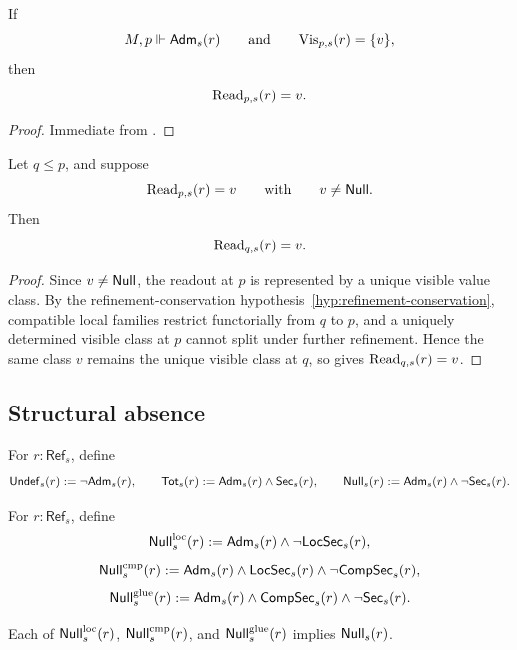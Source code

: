 \begin{corollary}\label{cor:nonnull-readout-criterion}
If
\[
M,p\Vdash \mathsf{Adm}_s(r)
\qquad\text{and}\qquad
\mathrm{Vis}_{p,s}(r)=\{v\},
\]
then
\[
\mathrm{Read}_{p,s}(r)=v.
\]
\end{corollary}

\begin{proof}
Immediate from .
\end{proof}

\begin{proposition}\label{prop:typed-readout-persistence}
Let $q\le p$, and suppose
\[
\mathrm{Read}_{p,s}(r)=v
\qquad\text{with}\qquad
v\neq \mathsf{Null}.
\]
Then
\[
\mathrm{Read}_{q,s}(r)=v.
\]
\end{proposition}

\begin{proof}
Since $v\neq\mathsf{Null}$, the readout at $p$ is represented by a unique visible value class. By the refinement-conservation hypothesis~\ref{hyp:refinement-conservation}, compatible local families restrict functorially from $q$ to $p$, and a uniquely determined visible class at $p$ cannot split under further refinement. Hence the same class $v$ remains the unique visible class at $q$, so  gives $\mathrm{Read}_{q,s}(r)=v$.
\end{proof}

\subsection{Structural absence}

\begin{definition}\label{def:undef-total-null}
For $r:\mathsf{Ref}_s$, define
\[
\mathsf{Undef}_s(r):=\neg\mathsf{Adm}_s(r),\qquad
\mathsf{Tot}_s(r):=\mathsf{Adm}_s(r)\land \mathsf{Sec}_s(r),\qquad
\mathsf{Null}_s(r):=\mathsf{Adm}_s(r)\land \neg\mathsf{Sec}_s(r).
\]
\end{definition}

\begin{definition}\label{def:null-failure-modes}
For $r:\mathsf{Ref}_s$, define
\[
\mathsf{Null}^{\mathrm{loc}}_s(r):=\mathsf{Adm}_s(r)\land \neg\mathsf{LocSec}_s(r),
\]
\[
\mathsf{Null}^{\mathrm{cmp}}_s(r):=\mathsf{Adm}_s(r)\land \mathsf{LocSec}_s(r)\land \neg\mathsf{CompSec}_s(r),
\]
\[
\mathsf{Null}^{\mathrm{glue}}_s(r):=\mathsf{Adm}_s(r)\land \mathsf{CompSec}_s(r)\land \neg\mathsf{Sec}_s(r).
\]
\end{definition}

\begin{proposition}\label{prop:null-modes-imply-null}
Each of $\mathsf{Null}^{\mathrm{loc}}_s(r)$, $\mathsf{Null}^{\mathrm{cmp}}_s(r)$, and $\mathsf{Null}^{\mathrm{glue}}_s(r)$ implies $\mathsf{Null}_s(r)$.
\end{proposition}

